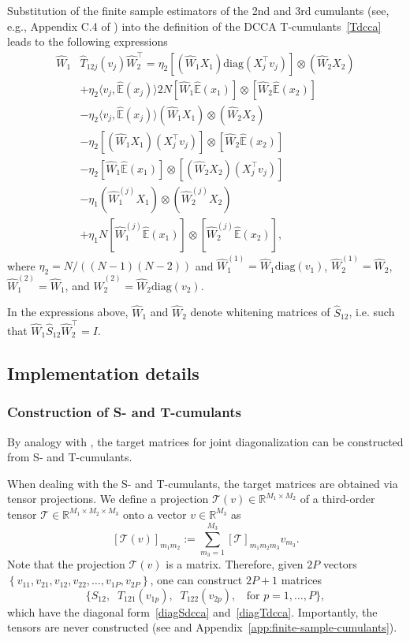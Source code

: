\documentclass{article}
\newcommand{\innerp}[1]{\langle#1\rangle}
\newcommand{\cbra}[1]{\left\{#1\right\}}
\newcommand{\wh}[1]{\widehat{#1}}
\newcommand{\diag}{\mathrm{diag}}
\newcommand{\R}{\mathbb{R}}
\newcommand{\ebb}{\mathbb{E}}
\newcommand{\webb}{\wh{\ebb}}
\newcommand{\tcal}{\mathcal{T}}
\begin{document}
Substitution of the finite sample estimators of the 2nd and 3rd cumulants (see, e.g., Appendix C.4 of \citet{PodEtAl2015}) into the definition of the DCCA T-cumulants~\eqref{Tdcca} leads to the following expressions
\begin{align*}
\wh{W}_1&\wh{T}_{12j}(v_j)\wh{W}_2^{\top} = 
\eta_2 [(\wh{W}_1 X_1) \diag( X_j^{\top} v_j )]\otimes (\wh{W}_2 X_2) \\
&+ \eta_2 \innerp{v_j,\webb(x_j)}  2N [\wh{W}_1\webb(x_1)] \otimes [\wh{W}_2 \webb(x_2)] \\
&- \eta_2 \innerp{v_j,\webb(x_j)} (\wh{W}_1X_1) \otimes (\wh{W}_2 X_2)  \\
&-\eta_2  [ (\wh{W}_1 X_1) (X_j^{\top} v_j) ] \otimes [\wh{W}_2\webb(x_2)] \\
&- \eta_2 [\wh{W}_1\webb(x_1)] \otimes [ (\wh{W}_2 X_2)(X_j^{\top} v_j) ]
 \\
& - \eta_1 (\wh{W}_1^{(j)} X_1) \otimes (\wh{W}_2^{(j)} X_2) \\
& + \eta_1 N [\wh{W}_1^{(j)} \webb(x_1)] \otimes [\wh{W}_2^{(j)} \webb(x_2)],
\end{align*}
where $\eta_2 = N / ( (N-1)(N-2) )$ and $\wh{W}_1^{(1)} = \wh{W}_1\diag(v_1)$, $\wh{W}_2^{(1)}=\wh{W}_2$, $\wh{W}_1^{(2)}=\wh{W}_1$, and $\wh{W}_2^{(2)}=\wh{W}_2\diag(v_2)$.

In the expressions above, $\wh{W}_1$ and $\wh{W}_2$ denote whitening matrices of $\wh{S}_{12}$, i.e. such that $\wh{W}_1 \wh{S}_{12} \wh{W}_2^{\top} = I$.




\subsection{Implementation details}
\label{app:implementation-details}

\subsubsection{Construction of S- and T-cumulants}
\label{app:S-and-T-cumulants}
By analogy with \citet{PodEtAl2015}, the target matrices for joint diagonalization can be constructed from S- and T-cumulants.

When dealing with the S- and T-cumulants, the target matrices are obtained via tensor projections. We define a projection $\tcal(v)\in\R^{M_1\times M_2}$ of a third-order tensor $\tcal\in\R^{M_1\times M_2\times M_3}$ onto a vector $v\in\R^{M_3}$ as
\begin{equation}\label{projection}
[\tcal(v)]_{m_1m_2} := \sum_{m_3=1}^{M_3} [\tcal]_{m_1m_2m_3} v_{m_3}.
\end{equation}
Note that the projection $\tcal(v)$ is a matrix.
Therefore, given $2P$ vectors $\cbra{v_{11},v_{21}, v_{12}, v_{22}, \dots,v_{1P},v_{2P}}$, one can construct $2P + 1$ matrices 
\begin{equation}\label{jdMatricesS&T}
\{S_{12}, \;\; T_{121}(v_{1p}), \;\; T_{122}(v_{2p}), \;\; \mbox{ for } p=1,\dots, P\},
\end{equation}
which have the diagonal form~\eqref{diagSdcca} and~\eqref{diagTdcca}. 
Importantly, the tensors are never constructed (see \citet{AnaEtAl2012,AnaEtAl2014,PodEtAl2015} and Appendix~\ref{app:finite-sample-cumulants}).
\end{document}
